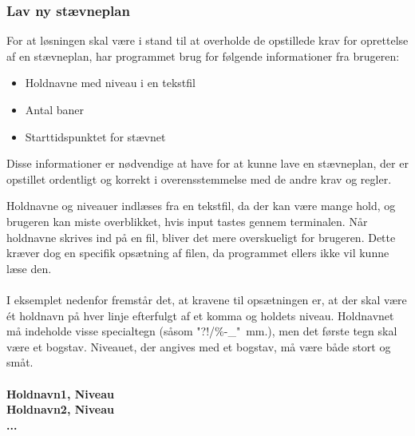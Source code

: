 \subsubsection{Lav ny stævneplan}
For at løsningen skal være i stand til at overholde de opstillede krav for oprettelse af en stævneplan, har programmet brug for følgende informationer fra brugeren:
\begin{itemize}
    \item Holdnavne med niveau i en tekstfil
    \item Antal baner
    \item Starttidspunktet for stævnet
\end{itemize}
Disse informationer er nødvendige at have for at kunne lave en stævneplan, der er opstillet ordentligt og korrekt i overensstemmelse med de andre krav og regler. 
\par
Holdnavne og niveauer indlæses fra en tekstfil, da der kan være mange hold, og brugeren kan miste overblikket, hvis input tastes gennem terminalen. Når holdnavne skrives ind på en fil, bliver det mere overskueligt for brugeren. Dette kræver dog en specifik opsætning af filen, da programmet ellers ikke vil kunne læse den.
\\\\
I eksemplet nedenfor fremstår det, at kravene til opsætningen er, at der skal være ét holdnavn på hver linje efterfulgt af et komma og holdets niveau. Holdnavnet må indeholde visse specialtegn (såsom "?!/\%-\_"\ mm.), men det første tegn skal være et bogstav. Niveauet, der angives med et bogstav, må være både stort og småt.
\\\\
\textbf{Holdnavn1, Niveau}\\
\textbf{Holdnavn2, Niveau}\\
\textbf{...}\\


